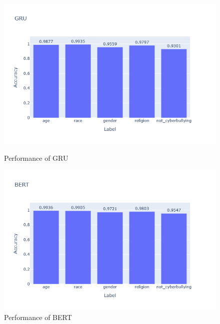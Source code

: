 \documentclass[pdflatex,sn-mathphys-num]{sn-jnl}%
\theoremstyle{thmstyleone}%
\theoremstyle{thmstyletwo}%
\theoremstyle{thmstylethree}%
\begin{document}
\begin{figure}[H]
    \begin{minipage}{0.48\textwidth}
        \centering
        \includegraphics[width=\textwidth]{Graphs/GRU.png}
        \caption{Performance of GRU}
        \label{fig:gru}
    \end{minipage}
    \hfill
    \begin{minipage}{0.48\textwidth}
        \centering
        \includegraphics[width=\textwidth]{Graphs/BERT.png}
        \caption{Performance of BERT}
        \label{fig:bert}
    \end{minipage}
\end{figure}
\end{document}
